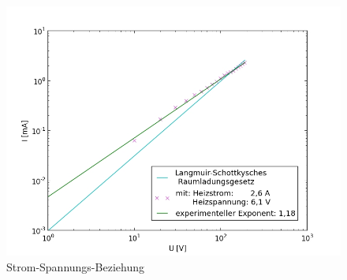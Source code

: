 	\begin{figure}[h]
		\begin{center}
		\includegraphics[scale=0.75]{picb1.jpg}
		\caption{Strom-Spannungs-Beziehung}
		\label{picb1}
		\end{center}	
	\end{figure}